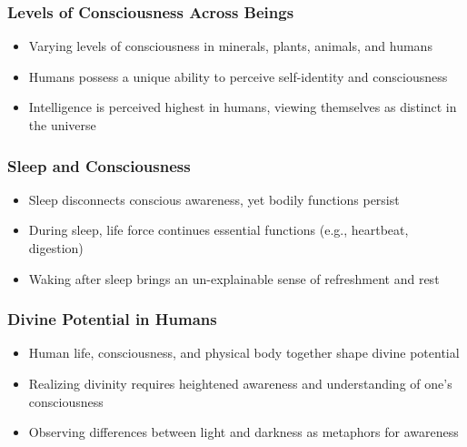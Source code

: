 \begin{frame}[fragile]\frametitle{Levels of Consciousness Across Beings}
    \begin{itemize}
        \item Varying levels of consciousness in minerals, plants, animals, and humans
        \item Humans possess a unique ability to perceive self-identity and consciousness
        \item Intelligence is perceived highest in humans, viewing themselves as distinct in the universe
    \end{itemize}
\end{frame}

\begin{frame}[fragile]\frametitle{Sleep and Consciousness}
    \begin{itemize}
        \item Sleep disconnects conscious awareness, yet bodily functions persist
        \item During sleep, life force continues essential functions (e.g., heartbeat, digestion)
        \item Waking after sleep brings an un-explainable sense of refreshment and rest
    \end{itemize}
\end{frame}

\begin{frame}[fragile]\frametitle{Divine Potential in Humans}
    \begin{itemize}
        \item Human life, consciousness, and physical body together shape divine potential
        \item Realizing divinity requires heightened awareness and understanding of one’s consciousness
        \item Observing differences between light and darkness as metaphors for awareness
    \end{itemize}
\end{frame}

